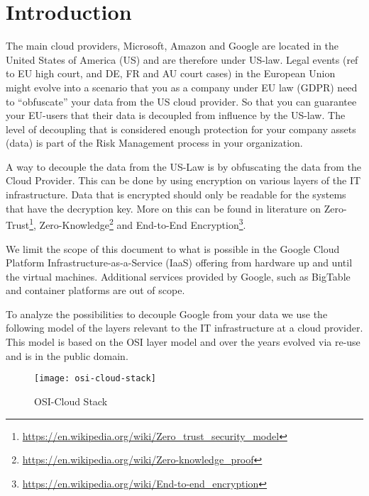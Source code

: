 
\section*{Introduction}

The main cloud providers, Microsoft, Amazon and Google 
are located in the United States of America (US) 
and are therefore under US-law. 
Legal events (ref to EU high court, and DE, FR and AU court cases) 
in the European Union might evolve into a scenario 
that you as a company under EU law (GDPR) need to “obfuscate” your data 
from the US cloud provider. 
So that you can guarantee your EU-users 
that their data is decoupled from influence by the US-law. 
The level of decoupling that is considered enough protection 
for your company assets (data) 
is part of the Risk Management process in your organization. 

A way to decouple the data from the US-Law 
is by obfuscating the data from the Cloud Provider. 
This can be done by using encryption on various layers of the IT infrastructure. 
Data that is encrypted should only be readable for the systems 
that have the decryption key. 
More on this can be found in literature on 
Zero-Trust\footnote{\url{https://en.wikipedia.org/wiki/Zero_trust_security_model}}, 
Zero-Knowledge\footnote{\url{https://en.wikipedia.org/wiki/Zero-knowledge_proof}} and 
End-to-End Encryption\footnote{\url{https://en.wikipedia.org/wiki/End-to-end_encryption}}. 

We limit the scope of this document to what is possible 
in the Google Cloud Platform Infrastructure-as-a-Service (IaaS) 
offering from hardware up and until the virtual machines. 
Additional services provided by Google, 
such as BigTable and container platforms are out of scope. 

To analyze the possibilities to decouple Google 
from your data we use the following model of the layers relevant to the IT infrastructure at a cloud provider. 
This model is based on the OSI layer model 
and over the years evolved via re-use 
and is in the public domain. 

\begin{figure}[!ht]
    \centering
    \texttt{[image: osi-cloud-stack]}
    \caption{OSI-Cloud Stack}
    \label{fig:osi-cloud-stack}
\end{figure}